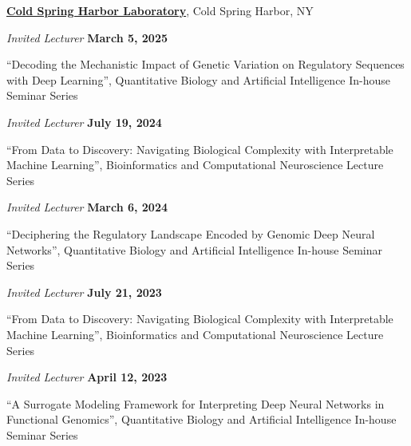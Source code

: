 \documentclass[10pt]{article}
\begin{document}
	\href{https://www.cshl.edu/}{\textbf{Cold Spring Harbor Laboratory}}, Cold Spring Harbor, NY
	\begin{outerlist}
	
		\item[] \textit{Invited Lecturer}%
		\hfill \textbf{March 5, 2025}
		\begin{innerlist}
			\item ``Decoding the Mechanistic Impact of Genetic Variation on Regulatory Sequences with Deep Learning'', Quantitative Biology and Artificial Intelligence In-house Seminar Series
		\end{innerlist}

		\item[] \textit{Invited Lecturer}%
		\hfill \textbf{July 19, 2024}
		\begin{innerlist}
			\item ``From Data to Discovery: Navigating Biological Complexity with Interpretable Machine Learning'', Bioinformatics and Computational Neuroscience Lecture Series
		\end{innerlist}
		
		\item[] \textit{Invited Lecturer}%
		\hfill \textbf{March 6, 2024}
		\begin{innerlist}
			\item ``Deciphering the Regulatory Landscape Encoded by Genomic Deep Neural Networks'', Quantitative Biology and Artificial Intelligence In-house Seminar Series
		\end{innerlist}
	
		\item[] \textit{Invited Lecturer}%
		\hfill \textbf{July 21, 2023}
		\begin{innerlist}
			\item ``From Data to Discovery: Navigating Biological Complexity with Interpretable Machine Learning'', Bioinformatics and Computational Neuroscience Lecture Series
		\end{innerlist}
		
		\item[] \textit{Invited Lecturer}%
		\hfill \textbf{April 12, 2023}
		\begin{innerlist}
			\item ``A Surrogate Modeling Framework for Interpreting Deep Neural Networks in Functional Genomics'', Quantitative Biology and Artificial Intelligence In-house Seminar Series
		\end{innerlist}
		
	\end{outerlist}
		
\end{document}
